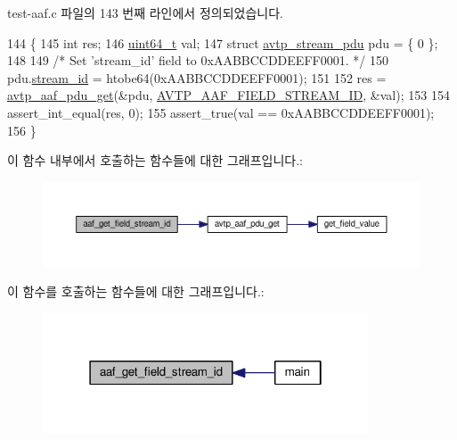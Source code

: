 test-\/aaf.\+c 파일의 143 번째 라인에서 정의되었습니다.


\begin{DoxyCode}
144 \{
145     \textcolor{keywordtype}{int} res;
146     \hyperlink{parse_8c_aec6fcb673ff035718c238c8c9d544c47}{uint64\_t} val;
147     \textcolor{keyword}{struct }\hyperlink{structavtp__stream__pdu}{avtp\_stream\_pdu} pdu = \{ 0 \};
148 
149     \textcolor{comment}{/* Set 'stream\_id' field to 0xAABBCCDDEEFF0001. */}
150     pdu.\hyperlink{structavtp__stream__pdu_af5af7b461263e29ceb91a8d3a8bc2c97}{stream\_id} = htobe64(0xAABBCCDDEEFF0001);
151 
152     res = \hyperlink{avtp__aaf_8h_acc4c927b036e22def8e6b6beb3ac6026}{avtp\_aaf\_pdu\_get}(&pdu, \hyperlink{avtp__aaf_8h_a7eaee6c1ebc806c0401dbe7b14cd22dba4760c4bfc01d5a5200aa35cc1cdc0c13}{AVTP\_AAF\_FIELD\_STREAM\_ID}, &val);
153 
154     assert\_int\_equal(res, 0);
155     assert\_true(val == 0xAABBCCDDEEFF0001);
156 \}
\end{DoxyCode}


이 함수 내부에서 호출하는 함수들에 대한 그래프입니다.\+:
\nopagebreak
\begin{figure}[H]
\begin{center}
\leavevmode
\includegraphics[width=350pt]{test-aaf_8c_a6a17b66f03bb1f1a9d18ca5523a892a4_cgraph}
\end{center}
\end{figure}




이 함수를 호출하는 함수들에 대한 그래프입니다.\+:
\nopagebreak
\begin{figure}[H]
\begin{center}
\leavevmode
\includegraphics[width=274pt]{test-aaf_8c_a6a17b66f03bb1f1a9d18ca5523a892a4_icgraph}
\end{center}
\end{figure}


